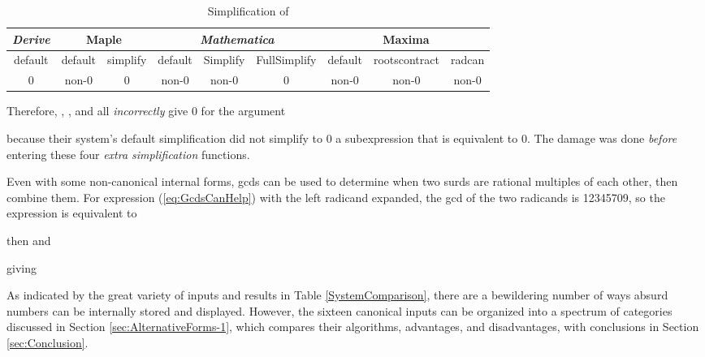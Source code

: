 \documentclass[12pt,english]{article}
\providecommand{\tabularnewline}{\\}
\theoremstyle{definition}
\theoremstyle{remark}
\theoremstyle{plain}
\theoremstyle{plain}
\begin{document}
\begin{table}[h]


\caption{Simplification of }


\label{SimplificationOfADifference}

\noindent \begin{centering}
\begin{tabular}{|c|c|c|c|c|c|c|c|c|}
\hline 
\negthinspace{}\textsl{Derive}\negthinspace{} & \multicolumn{2}{c|}{Maple} & \multicolumn{3}{c|}{\textsl{Mathematica}} & \multicolumn{3}{c|}{Maxima}\tabularnewline
\hline 
\negthinspace{}default\negthinspace{} & \negthinspace{}default\negthinspace{} & \negthinspace{}simplify\negthinspace{} & \negthinspace{}default\negthinspace{} & \negthinspace{}Simplify\negthinspace{} & \negthinspace{}FullSimplify\negthinspace{} & \negthinspace{}default\negthinspace{} & \negthinspace{}rootscontract\negthinspace{} & \negthinspace{}radcan\negthinspace{}\tabularnewline
\hline 
\hline 
0 & non-0 & 0 & non-0 & non-0 & 0 & non-0 & non-0 & non-0\tabularnewline
\hline 
\end{tabular}
\par\end{centering}

\end{table}


Therefore, , ,
 and  all
\textsl{incorrectly} give 0 for the argument\vspace{-0.6em}

because their system's default simplification did not simplify to
0 a subexpression that is equivalent to 0. The damage was done \textsl{before}
entering these four \textsl{extra simplification} functions.

Even with some non-canonical internal forms, gcds can be used to determine
when two surds are rational multiples of each other, then combine
them. For expression (\ref{eq:GcdsCanHelp}) with the left radicand
expanded, the gcd of the two radicands is 12345709, so the expression
is equivalent to

then  and

giving

 As indicated by the great variety of inputs and results in Table
\ref{SystemComparison}, there are a bewildering number of ways absurd
numbers can be internally stored and displayed. However, the sixteen
canonical inputs can be organized into a spectrum of categories discussed
in Section \ref{sec:AlternativeForms-1}, which compares their algorithms,
advantages, and disadvantages, with conclusions in Section \ref{sec:Conclusion}.
\end{document}

